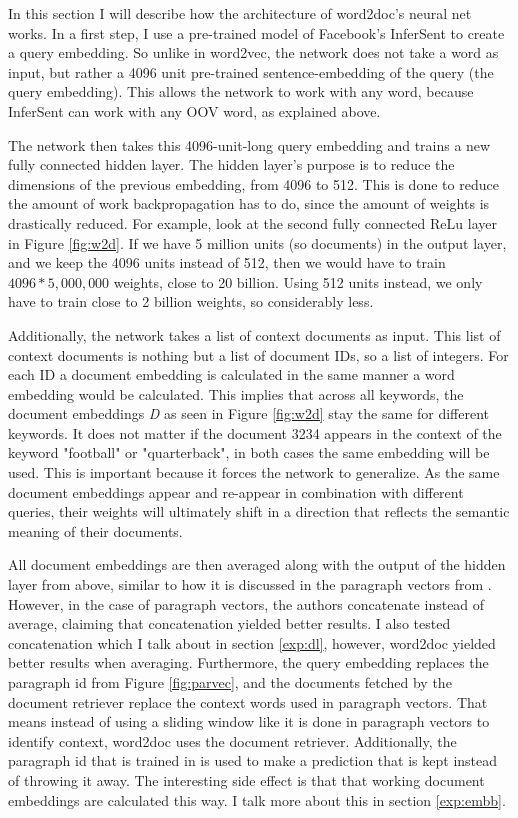 In this section I will describe how the architecture of word2doc's neural net works. In a first step, I use a pre-trained model of
Facebook's InferSent \citep{infersent} to create a query embedding. So unlike in word2vec, the network does not take a word
as input, but rather a 4096 unit pre-trained sentence-embedding of the query (the query embedding). This allows the network to work
with any word, because InferSent can work with any OOV word, as explained above.

The network then takes this 4096-unit-long query embedding and trains a new fully connected hidden layer. The hidden layer's
purpose is to reduce the dimensions of the previous embedding, from 4096 to 512. This is done to reduce
the amount of work backpropagation has to do, since the amount of weights is drastically reduced. For example, look at the second
fully connected ReLu layer in Figure \ref{fig:w2d}. If we have 5 million units (so documents) in the output layer, and we keep the
4096 units instead of 512, then we would have to train $4096 * 5,000,000$ weights, close to 20 billion. Using 512 units
instead, we only have to train close to 2 billion weights, so considerably less.

Additionally, the network takes a list of context documents as input. This list of context documents is nothing
but a list of document IDs, so a list of integers. For each ID a document embedding is calculated in the same manner a word
embedding would be calculated. This implies that across all keywords, the document embeddings \textit{D} as seen in Figure
\ref{fig:w2d} stay the same for different keywords. It does not matter if the document 3234 appears in the context of the keyword
"football" or "quarterback", in both cases the same embedding will be used. This is important because it forces the network to
generalize. As the same document embeddings appear and re-appear in combination with different queries, their weights will
ultimately shift in a direction that reflects the semantic meaning of their documents.

All document embeddings are then averaged along with the output of the hidden layer from above,
similar to how it is discussed in the paragraph vectors from \citet{doc2vec}. However, in the case of paragraph vectors, the
authors concatenate instead of average, claiming that concatenation yielded better results. I also tested concatenation which I talk
about in section \ref{exp:dl}, however, word2doc yielded better results when averaging. Furthermore, the query embedding replaces
the paragraph id from Figure \ref{fig:parvec}, and the documents fetched by the document retriever replace the context
words used in paragraph vectors. That means instead of using a sliding window like it is done in paragraph vectors to identify
context, word2doc uses the document retriever. Additionally, the paragraph id that is trained in \citet{doc2vec} is used to make a
prediction that is kept instead of throwing it away. The interesting side effect is that that working document embeddings are
calculated this way. I talk more about this in section \ref{exp:embb}.

